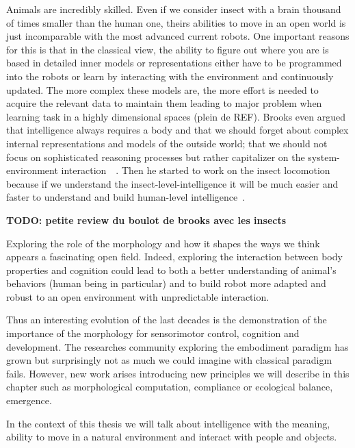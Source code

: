 Animals are incredibly skilled. Even if we consider insect with a brain thousand of times smaller than the human one, theirs abilities to move in an open world is just incomparable with the most advanced current robots. One important reasons for this is that in the classical view, the ability to figure out where you are is based in detailed inner models or representations either have to be programmed into the robots or learn by interacting with the environment and continuously updated. The more complex these models are, the more effort is needed to acquire the relevant data to maintain them leading to major problem when learning task in a highly dimensional spaces (plein de REF). Brooks even argued that intelligence always requires a body and that we should forget about complex internal representations and models of the outside world; that we should not focus on sophisticated reasoning processes but rather capitalizer on the system-environment interaction~\cite{brooks1991intelligence}~\cite{brooks1995intelligence}. Then he started to work on the insect locomotion because if we understand the insect-level-intelligence it will be much easier and faster to understand and build human-level intelligence~\cite{brooks1996prospects}.

\textbf{TODO: petite review du boulot de brooks avec les insects}

Exploring the role of the morphology and how it shapes the ways we think appears a fascinating open field. Indeed, exploring the interaction between body properties and cognition could lead to both a better understanding of animal's behaviors (human being in particular) and to build robot more adapted and robust to an open environment with unpredictable interaction.

Thus an interesting evolution of the last decades is the demonstration of the importance of the morphology for sensorimotor control, cognition and development. The researches community exploring the embodiment paradigm has grown but surprisingly not as much we could imagine with classical paradigm fails. However, new work arises introducing new principles we will describe in this chapter such as morphological computation, compliance or ecological balance, emergence.

In the context of this thesis we will talk about intelligence with the meaning, ability to move in a natural environment and interact with people and objects.



